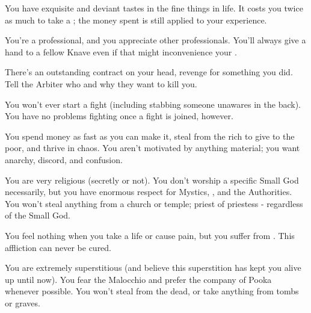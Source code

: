 {    You have exquisite and deviant tastes in the fine things in life. It costs you twice as much to take a ; the money spent is still applied to your experience.


    You're a professional, and you appreciate other professionals.  You'll always give a hand to a fellow Knave even if that might inconvenience your .


    There's an outstanding contract on your head, revenge for something you did.  Tell the Arbiter who and why they want to kill you.


    You won't ever start a fight (including stabbing someone unawares in the back).  You have no problems fighting once a fight is joined, however.  

    \newpage 


    You spend money as fast as you can make it, steal from the rich to give to the poor, and thrive in chaos.  You aren't motivated by anything material; you want anarchy, discord, and confusion.    


    You are very religious (secretly or not).  You don't worship a specific Small God necessarily, but you have enormous respect for Mystics, \TheAuthority, and the Authorities.  You won't steal anything from a church or temple; priest of priestess - regardless of the Small God.



    You feel nothing when you take a life or cause pain, but you suffer from .  This affliction can never be cured.



    You are extremely superstitious (and believe this superstition has kept you alive up until now).  You fear the Malocchio and prefer the company of Pooka whenever possible.  You won't steal from the dead, or take anything from tombs or graves.


}
